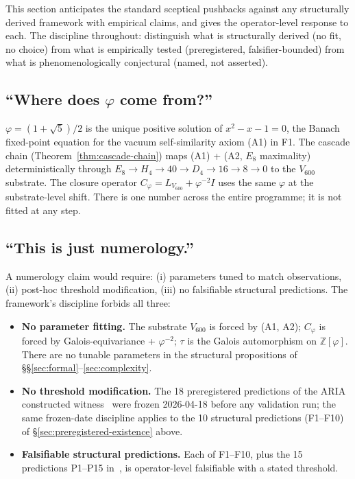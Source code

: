 \documentclass[11pt]{article}
\theoremstyle{plain}
\theoremstyle{definition}
\theoremstyle{remark}
\newcommand{\Zphi}{\mathbb{Z}[\varphi]}
\newcommand{\Cph}{C_\varphi}
\begin{document}
This section anticipates the standard sceptical pushbacks against any structurally derived framework with empirical claims, and gives the operator-level response to each. The discipline throughout: distinguish what is structurally derived (no fit, no choice) from what is empirically tested (preregistered, falsifier-bounded) from what is phenomenologically conjectural (named, not asserted).

\subsection{``Where does $\varphi$ come from?''}

$\varphi = (1 + \sqrt 5)/2$ is the unique positive solution of $x^2 - x - 1 = 0$, the Banach fixed-point equation for the vacuum self-similarity axiom (A1) in \citet{SmartXXXVI} F1. The cascade chain (Theorem~\ref{thm:cascade-chain}) maps (A1) + (A2, $E_8$ maximality) deterministically through $E_8 \to H_4 \to 40 \to D_4 \to 16 \to 8 \to 0$ to the $V_{600}$ substrate. The closure operator $\Cph = L_{V_{600}} + \varphi^{-2} I$ uses the same $\varphi$ at the substrate-level shift. There is one number across the entire programme; it is not fitted at any step.

\subsection{``This is just numerology.''}

A numerology claim would require: (i) parameters tuned to match observations, (ii) post-hoc threshold modification, (iii) no falsifiable structural predictions. The framework's discipline forbids all three:

\begin{itemize}[leftmargin=2em]
\item \textbf{No parameter fitting.} The substrate $V_{600}$ is forced by (A1, A2); $\Cph$ is forced by Galois-equivariance + $\varphi^{-2}$; $\tau$ is the Galois automorphism on $\Zphi$. There are no tunable parameters in the structural propositions of \S\S\ref{sec:formal}--\ref{sec:complexity}.
\item \textbf{No threshold modification.} The 18 preregistered predictions of the ARIA constructed witness~\citep{SmartAriaChess2026} were frozen 2026-04-18 before any validation run; the same frozen-date discipline applies to the 10 structural predictions (F1--F10) of \S\ref{sec:preregistered-existence} above.
\item \textbf{Falsifiable structural predictions.} Each of F1--F10, plus the 15 predictions P1--P15 in~\citep{SmartLifeAsClosure}, is operator-level falsifiable with a stated threshold.
\end{itemize}
\end{document}

